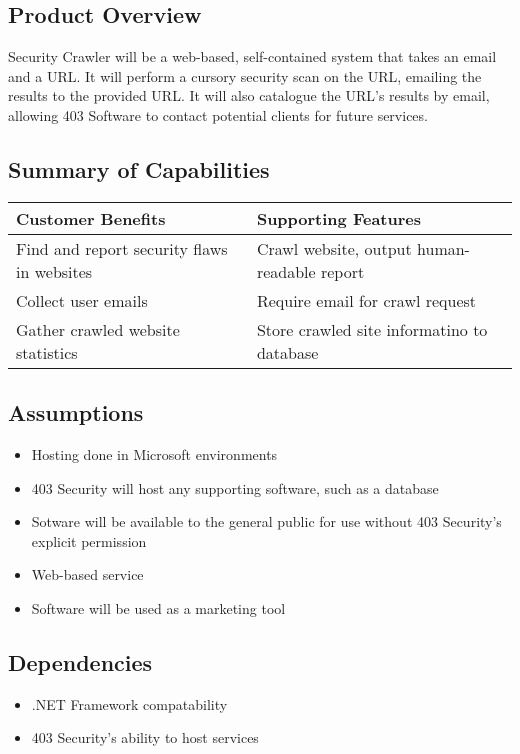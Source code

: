 \subsection{Product Overview}

Security Crawler will be a web-based, self-contained system that takes an email and a URL.  It will perform a cursory security scan on the URL, emailing the results to the provided URL.  It will also catalogue the URL's results by email, allowing 403 Software to contact potential clients for future services.

\subsection{Summary of Capabilities}
\begin{tabularx}{\textwidth}{|X|X|}
    \hline
    {\bf Customer Benefits} & {\bf Supporting Features} \\ \hline
    Find and report security flaws in websites & Crawl website, output human-readable report \\ \hline
    Collect user emails & Require email for crawl request \\ \hline
    Gather crawled website statistics & Store crawled site informatino to database \\ \hline 
\end{tabularx}

\subsection{Assumptions}
\begin{itemize}
    \item Hosting done in Microsoft environments
    \item 403 Security will host any supporting software, such as a database
    \item Sotware will be available to the general public for use without 403 Security's explicit permission
    \item Web-based service
    \item Software will be used as a marketing tool
\end{itemize}

\subsection{Dependencies}
\begin{itemize}
    \item .NET Framework compatability
    \item 403 Security's ability to host services
\end{itemize}

